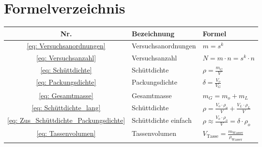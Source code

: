 \chapter{Formelverzeichnis}
\label{sec: Formel}

\renewcommand{\arraystretch}{2}

\begin{table}[h]
	\centering
	\begin{tabular}{|c|p{3.8cm}|p{9.8cm}|}
		\hline
		\textbf{Nr.} & \textbf{Bezeichnung} & \textbf{Formel} \\
		\hline
		\ref{eq: Versuchsanordnungen} & Versuchsanordnungen & $m = s^k$ \\
		\hline
		\ref{eq: Versuchsanzahl} & Versuchsanzahl & $N = m \cdot n = s^k \cdot n$ \\
		\hline
		\ref{eq: Schüttdichte} & Schüttdichte & $\rho = \frac{m_G}{V}$ \\
		\hline
		\ref{eq: Packungsdichte} & Packungsdichte & $\delta = \frac{V_o}{V_G}$ \\
		\hline
		\ref{eq: Gesamtmasse} & Gesamtmasse & $m_G = m_o + m_L$ \\
		\hline
		\ref{eq: Schüttdichte_lang} & Schüttdichte & $\rho = \frac{V_o \cdot \rho_o}{V} + \frac{V_L \cdot \rho_L}{V}$ \\
		\hline
		\ref{eq: Zus_Schüttdichte_Packungsdichte} & Schüttdichte einfach & $\rho \approx \frac{V_o \cdot \rho_o}{V} = \delta \cdot \rho_o$ \\
		\hline
		\ref{eq: Tassenvolumen} & Tassenvolumen & $V_{\text{Tasse}} = \frac{m_{\text{Wasser}}}{\rho_{\text{Wasser}}}$ \\
		\hline
	\end{tabular}
\end{table}